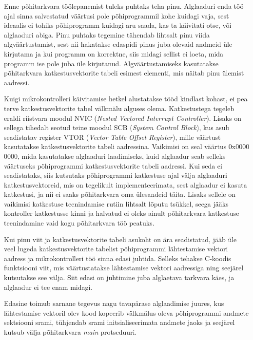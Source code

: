\documentclass[12pt,a4paper]{article}
\begin{document}
Enne põhitarkvara töölepanemist tuleks puhtaks teha pinu. Alglaaduri enda töö
ajal sinna salvestatud väärtusi pole põhiprogrammil kohe kuidagi vaja, sest
ideaalis ei tohiks põhiprogramm kuidagi aru saada, kas ta käivitati otse, või
alglaaduri abiga. Pinu puhtaks tegemine tähendab lihtsalt pinu viida
algväärtustamist, sest nii hakatakse edaspidi pinus juba olevaid andmeid üle
kirjutama ja kui programm on korrektne, siis midagi sellist ei loeta, mida
programm ise pole juba üle kirjutanud. Algväärtustamiseks kasutatakse
põhitarkvara katkestusvektorite tabeli esimest elementi, mis näitab pinu ülemist
aadressi.

Kuigi mikrokontrolleri käivitamise hetkel alustatakse tööd kindlast kohast, ei
pea terve katkestusvektorite tabel välkmälu alguses olema. Katkestustega tegeleb
eraldi riistvara moodul NVIC (\textit{Nested Vectored Interrupt Controller}).
Lisaks on sellega tihedalt seotud teine moodul SCB (\textit{System Control
Block}), kus asub seadistatav register VTOR (\textit{Vector Table Offset
Register}), mille väärtust kasutatakse katkestusvektorite tabeli aadressina.
\cite{CM3pm} Vaikimisi on seal väärtus 0x0000 0000, mida kasutatakse alglaaduri
laadimiseks, kuid alglaadur seab selleks väärtuseks põhiprogrammi
katkestusvektorite tabeli aadressi. Kui seda ei seadistataks, siis kutsutaks
põhiprogrammi katkestuse ajal välja alglaaduri katkestusvektoreid, mis on
tegelikult implementeerimata, sest alglaadur ei kasuta katkestusi, ja nii ei
saaks põhitarkvara oma ülesandeid täita. Lisaks sellele on vaikimisi katkestuse
teenindamise rutiin lihtsalt lõputu tsükkel, seega jääks kontroller katkestusse
kinni ja halvatud ei oleks ainult põhitarkvara katkestuse teenindamine vaid kogu
põhitarkvara töö peatuks.

Kui pinu viit ja katkestusvektorite tabeli asukoht on ära seadistatud, jääb üle
veel lugeda katkestusvektorite tabelist põhiprogrammi lähtestamise vektori
aadress ja mikrokontrolleri töö sinna edasi juhtida. Selleks tehakse C-koodis
funktsiooni viit, mis väärtustatakse lähtestamise vektori aadressiga ning
seejärel kutsutakse see välja. Siit edasi on juhtimine juba alglaetava tarkvara
käes, ja alglaadur ei tee enam midagi.

Edasine toimub sarnane tegevus nagu tavapärase alglaadimise juures, kus
lähtestamise vektoril olev kood kopeerib välkmälus oleva põhiprogrammi andmete
sektsiooni \gls{sram}i, tühjendab \gls{sram}i initsialiseerimata andmete jaoks
ja seejärel kutsub välja põhitarkvara \textit{main} protseduuri.
\end{document}
